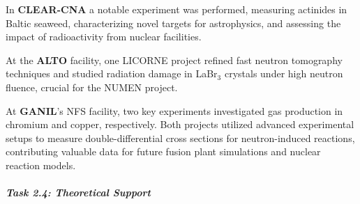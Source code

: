 In \textbf{CLEAR-CNA} a notable experiment was performed, measuring actinides in Baltic seaweed, characterizing novel targets for astrophysics, and assessing the impact of radioactivity from nuclear facilities. 

At the \textbf{ALTO} facility, one LICORNE project refined fast neutron tomography techniques and studied radiation damage in LaBr$_{3}$ crystals under high neutron fluence, crucial for the NUMEN project. 

At \textbf{GANIL}'s NFS facility, two key experiments investigated gas production in chromium and copper, respectively. Both projects utilized advanced experimental setups to measure double-differential cross sections for neutron-induced reactions, contributing valuable data for future fusion plant simulations and nuclear reaction models.

\subparagraph{Task 2.4: Theoretical Support} \mbox{}

